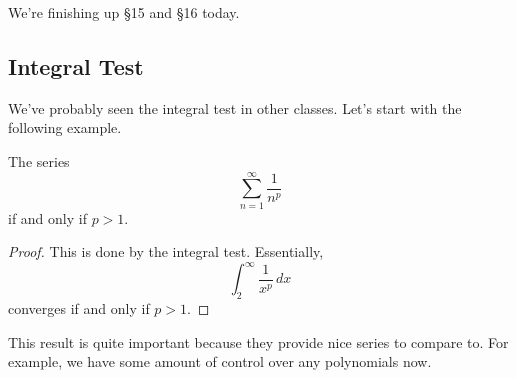\documentclass[../notes.tex]{subfiles}
\begin{document}















We're finishing up \S15 and \S16 today.

\subsection{Integral Test}
We've probably seen the integral test in other classes. Let's start with the following example.
\begin{prop}
	The series
	\[\sum_{n=1}^\infty\frac1{n^p}\]
	if and only if $p>1.$
\end{prop}
\begin{proof}
	This is done by the integral test. Essentially,
	\[\int_2^\infty\frac1{x^p}\,dx\]
	converges if and only if $p>1.$
\end{proof}
\begin{remark}
	This result is quite important because they provide nice series to compare to. For example, we have some amount of control over any polynomials now.
\end{remark}
\end{document}
